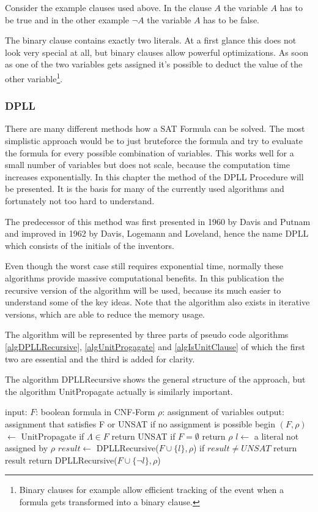 Consider the example clauses used above. In the clause $A$ the variable $A$ has to be true and in the other example $\lnot A$ the variable $A$ has to be false.

The binary clause contains exactly two literals. At a first glance this does not look very special at all, but binary clauses allow powerful optimizations. As soon as one of the two variables gets assigned it's possible to deduct the value of the other variable\footnote{Binary clauses for example allow efficient tracking of the event when a formula gets transformed into a binary clause.}.
\subsubsection{DPLL}

There are many different methods how a SAT Formula can be solved. The most simplistic approach would be to just bruteforce the formula and try to evaluate the formula for every possible combination of variables. This works well for a small number of variables but does not scale, because the computation time increases exponentially. In this chapter the method of the DPLL Procedure will be presented. It is the basis for many of the currently used algorithms and fortunately not too hard to understand.

The predecessor of this method was first presented in 1960 by Davis and Putnam and improved in 1962 by Davis, Logemann and Loveland, hence the name DPLL which consists of the initials of the inventors.

Even though the worst case still requires exponential time, normally these algorithms provide massive computational benefits. In this publication the recursive version of the algorithm will be used, because its much easier to understand some of the key ideas. Note that the algorithm also exists in iterative versions, which are able to reduce the memory usage.

The algorithm will be represented by three parts of pseudo code algorithms \ref{algDPLLRecursive}, \ref{algUnitProgagate} and \ref{algIsUnitClause} of which the first two are essential and the third is added for clarity.

The algorithm DPLLRecursive shows the general structure of the approach, but the algorithm UnitPropagate actually is similarly important.

\begin{algorithm}[caption={DPLLRecursive}, label={algDPLLRecursive}]
 input: $F$: boolean formula in CNF-Form
	$\rho$: assignment of variables
 output: assignment that satisfies F or 
	UNSAT if no assignment is possible
 begin
   $(F, \rho)$  $\gets$ UnitPropagate
   if $\Lambda \in F$
	return UNSAT
   if $F = \emptyset$
	return $\rho$
   $l \gets$ a literal not assigned by $\rho$
   $result \gets$ DPLLRecursive($F \cup \{l\}, \rho$)
   if $result \neq UNSAT$
	return result
   return DPLLRecursive($F \cup \{\lnot l\}, \rho$)
\end{algorithm}

